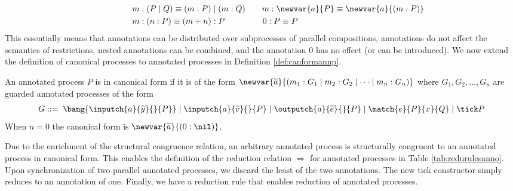 \begin{align*}
    \kern4em &m : (P \mid Q) \equiv (m : P) \mid (m : Q)\quad\quad m : \newvar{a}{P} \equiv \newvar{a}{(m : P)}\\
    \kern-4em &m : (n : P) \equiv (m + n) : P\quad\quad\quad\;\;\quad 0 : P \equiv P
\end{align*}
This essentially means that annotations can be distributed over subprocesses of parallel compositions, annotations do not affect the semantics of restrictions, nested annotations can be combined, and the annotation $0$ has no effect (or can be introduced). We now extend the definition of canonical processes to annotated processes in Definition \ref{def:canformannp}.

\begin{defi}
An annotated process $P$ is in canonical form if it is of the form $\newvar{\widetilde{a}}{(m_1 : G_1 \mid m_2 : G_2 \mid \dots \mid m_n : G_n)}$ where $G_1,G_2,\dots,G_n$ are guarded annotated processes of the form 
\begin{align*}
    G ::=\; \bang{\inputch{a}{\widetilde{y}}{}{P}} \mid \inputch{a}{\widetilde{v}}{}{P} \mid \outputch{a}{\widetilde{e}}{}{P} \mid \match{e}{P}{x}{Q} \mid \tick P
\end{align*}
When $n = 0$ the canonical form is $\newvar{\widetilde{a}}{(0 : \nil)}$.
\label{def:canformannp}
\end{defi}
%
Due to the enrichment of the structural congruence relation, an arbitrary annotated process is structurally congruent to an annotated process in canonical form. This enables the definition of the reduction relation $\Rightarrow$ for annotated processes in Table \ref{tab:redurulesanno}. Upon synchronization of two parallel annotated processes, we discard the least of the two annotations. The new tick constructor simply reduces to an annotation of one. Finally, we have a reduction rule that enables reduction of annotated processes.\\
%

